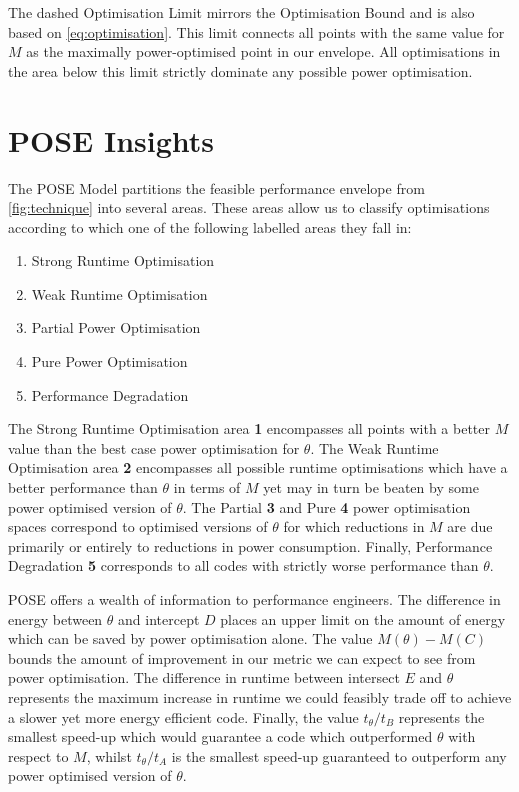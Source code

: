 The dashed Optimisation Limit  mirrors the Optimisation Bound and is also based on \autoref{eq:optimisation}.
This limit connects all points with the same value for $M$ as the maximally power-optimised point in our envelope.
All optimisations in the area below this limit strictly dominate any possible power optimisation.

\section{POSE Insights}
\label{sec:insights}
The POSE Model partitions the feasible performance envelope from \autoref{fig:technique} into several areas.
These areas allow us to classify optimisations according to which one of the following labelled areas they fall in:

\begin{multicols}{2}
\begin{enumerate}
\item Strong Runtime Optimisation
\item Weak Runtime Optimisation
\item Partial Power Optimisation
\item Pure Power Optimisation
\item Performance Degradation \\ 
\end{enumerate}
\end{multicols}

The Strong Runtime Optimisation area \textbf{1} encompasses all points with a better $M$ value than the best case power optimisation for $\theta$. The Weak Runtime Optimisation area \textbf{2} encompasses all possible runtime optimisations which have a better performance than $\theta$ in terms of $M$ yet may in turn be beaten by some power optimised version of $\theta$. The Partial \textbf{3} and Pure \textbf{4} power optimisation spaces correspond to optimised versions of $\theta$ for which reductions in $M$ are due primarily or entirely to reductions in power consumption.
Finally, Performance Degradation \textbf{5} corresponds to all codes with strictly worse performance than $\theta$.

POSE offers a wealth of information to performance engineers.
The difference in energy between $\theta$ and intercept $D$ places an upper limit on the amount of energy which can be saved by power optimisation alone.
The value $M(\theta) - M(C)$ bounds the amount of improvement in our metric we can expect to see from power optimisation.
The difference in runtime between intersect $E$ and $\theta$ represents the maximum increase in runtime we could feasibly trade off to achieve a slower yet more energy efficient code.
Finally, the value $t_\theta / t_B$ represents the smallest speed-up which would guarantee a code which outperformed $\theta$ with respect to $M$, whilst $t_\theta / t_A$ is the smallest speed-up guaranteed to outperform any power optimised version of $\theta$.

